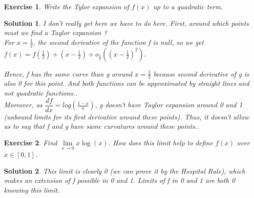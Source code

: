 \documentclass[12pt,a4paper]{article}
\newtheorem{exercise}{Exercise}
\newtheorem{solution}{Solution}
\begin{document}
\begin{exercise}
Write the Tylor expansion of $f(x)$ up to a quadratic term.
\end{exercise}
\begin{solution}
I don't really get here we have to do here. First, around which points must we find a Taylor expansion ?\\

For $x = \frac{1}{2}$, the second derivative of the function f is null, so we get $f(x) = f(\frac{1}{2}) + (x-\frac{1}{2}) + o_{\frac{1}{2}}((x-\frac{1}{2})^2)$.

Hence, f has the same curve than g around $x = \frac{1}{2}$ because second derivative of g is also 0 for this point. And both functions can be approximated by straight lines and not quadratic functions..\\

Moreover, as $\dfrac{df}{dx} = log(\frac{1-x}{x})$, g doesn't have Taylor expansion around 0 and 1 (unbound limits for its first derivative around these points).
Thus, it doesn't allow us to say that f and g have same curvatures around these points..
\end{solution}
\begin{exercise}
Find $\lim\limits_{x\to 0} x\log(x)$. How does this limit help to define $f(x)$ over $x\in [0,1]$.
\end{exercise}
\begin{solution}
This limit is clearly 0 (we can prove it by the Hospital Rule), which makes an extension of f possible in 0 and 1. Limits of f in 0 and 1 are both 0 knowing this limit.
\end{solution}
\end{document}
